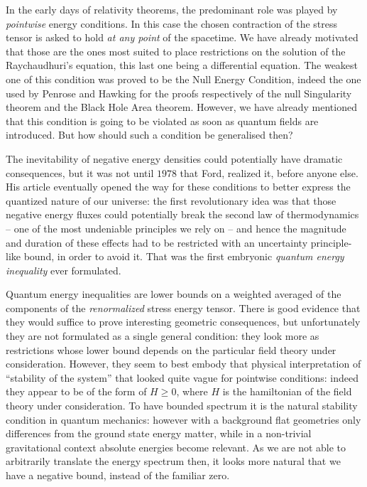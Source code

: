 In the early days of relativity theorems, the predominant role was played by \emph{pointwise} energy conditions. In this case the chosen contraction of the stress tensor is asked to hold \emph{at any point} of the spacetime. We have already motivated that those are the ones most suited to place restrictions on the solution of the Raychaudhuri's equation, this last one being a differential equation. The weakest one of this condition was proved to be the Null Energy Condition, indeed the one used by Penrose and Hawking for the proofs respectively of the null Singularity theorem and the Black Hole Area theorem. However, we have already mentioned that this condition is going to be violated as soon as quantum fields are introduced. But how should such a condition be generalised then?

The inevitability of negative energy densities could potentially have dramatic consequences, but it was not until \(1978\) that Ford, realized it, before anyone else. His article eventually opened the way for these conditions to better express the quantized nature of our universe: the first revolutionary idea was that those negative energy fluxes could potentially break the second law of thermodynamics -- one of the most undeniable principles we rely on -- and hence the magnitude and duration of these effects had to be restricted with an uncertainty principle-like bound, in order to avoid it. That was the first embryonic \emph{quantum energy inequality} ever formulated.

Quantum energy inequalities are lower bounds on a weighted averaged of the components of the \emph{renormalized} stress energy tensor. There is good evidence that they would suffice to prove interesting geometric consequences, but unfortunately they are not formulated as a single general condition: they look more as restrictions whose lower bound depends on the particular field theory under consideration. However, they seem to best embody that physical interpretation of ``stability of the system'' that looked quite vague for pointwise conditions: indeed they appear to be of the form of \(H\ge 0\), where \(H\) is the hamiltonian of the field theory under consideration. To have bounded spectrum it is the natural stability condition in quantum mechanics: however with a background flat geometries only differences from the ground state energy matter, while in a non-trivial gravitational context absolute energies become relevant. As we are not able to arbitrarily translate the energy spectrum then, it looks more natural that we have a negative bound, instead of the familiar zero.

